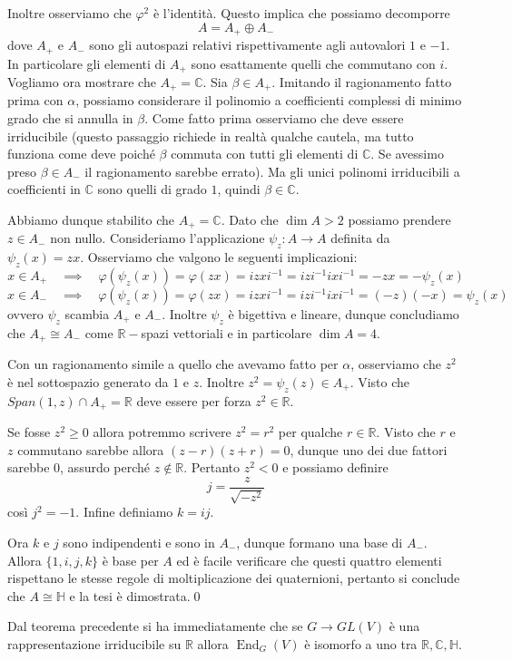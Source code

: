 \documentclass[11pt]{article}
\theoremstyle{plain}
\theoremstyle{definition}
\theoremstyle{remark}
\newcommand{\C}{\mathbb{C}}
\newcommand{\R}{\mathbb{R}}
\newcommand{\HH}{\mathbb{H}}
\DeclareMathOperator{\End}{End}
\begin{document}
Inoltre osserviamo che $\varphi^2$ è l'identità. Questo implica che possiamo decomporre
\[ A = A_+ \oplus A_-\] dove $A_+$ e $A_-$ sono gli autospazi relativi rispettivamente agli autovalori $1$ e $-1$.
In particolare gli elementi di $A_+$ sono esattamente quelli che commutano con $i$.
Vogliamo ora mostrare che $A_+ = \C$.
Sia $\beta\in A_+$. Imitando il ragionamento fatto prima con $\alpha$, possiamo considerare il polinomio a coefficienti complessi di minimo grado
che si annulla in $\beta$. Come fatto prima osserviamo che deve essere irriducibile (questo passaggio richiede in realtà qualche cautela,
ma tutto funziona come deve poiché $\beta$ commuta con tutti gli elementi di $\C$. Se avessimo preso $\beta\in A_-$ il ragionamento sarebbe errato).
Ma gli unici polinomi irriducibili a coefficienti in $\C$ sono quelli di grado $1$, quindi $\beta\in\C$.

Abbiamo dunque stabilito che $A_+ = \C$. Dato che $\dim A > 2$ possiamo prendere $z\in A_-$ non nullo.
Consideriamo l'applicazione $\psi_z:A\to A$ definita da $\psi_z(x) = zx$.
Osserviamo che valgono le seguenti implicazioni:
\[ x\in A_+ \quad\implies\quad \varphi(\psi_z(x)) = \varphi(zx) = izxi^{-1} = izi^{-1}ixi^{-1} = -zx = -\psi_z(x)\]
\[ x\in A_- \quad\implies\quad \varphi(\psi_z(x)) = \varphi(zx) = izxi^{-1} = izi^{-1}ixi^{-1} = (-z)(-x) = \psi_z(x)\]
ovvero $\psi_z$ scambia $A_+$ e $A_-$. Inoltre $\psi_z$ è bigettiva e lineare, dunque concludiamo che $A_+\cong A_-$ come $\R-$spazi vettoriali e in particolare $\dim A = 4$.

Con un ragionamento simile a quello che avevamo fatto per $\alpha$, osserviamo che $z^2$ è nel sottospazio generato da $1$ e $z$. Inoltre $z^2=\psi_z(z)\in A_+$.
Visto che $Span(1,z) \cap A_+ = \R$ deve essere per forza $z^2\in\R$.

Se fosse $z^2 \ge 0$ allora potremmo scrivere $z^2=r^2$ per qualche $r\in\R$.
Visto che $r$ e $z$ commutano sarebbe allora $(z-r)(z+r)=0$, dunque uno dei due fattori sarebbe $0$, assurdo perché $z\not\in\R$. Pertanto $z^2 < 0$ e possiamo definire
\[j = \frac{z}{\sqrt{-z^2}}\]
così $j^2 = -1$. Infine definiamo $k = ij$.

Ora $k$ e $j$ sono indipendenti e sono in $A_-$, dunque formano una base di $A_-$. Allora $\{1,i,j,k\}$ è base per $A$ ed è facile
verificare che questi quattro elementi rispettano le stesse regole di moltiplicazione dei quaternioni, pertanto si conclude che $A\cong\HH$ e la tesi è dimostrata.\qed

Dal teorema precedente si ha immediatamente che se $G\to GL(V)$ è una rappresentazione irriducibile su $\R$ allora $\End_G(V)$ è isomorfo a uno
tra $\R, \C, \HH$.
\end{document}
